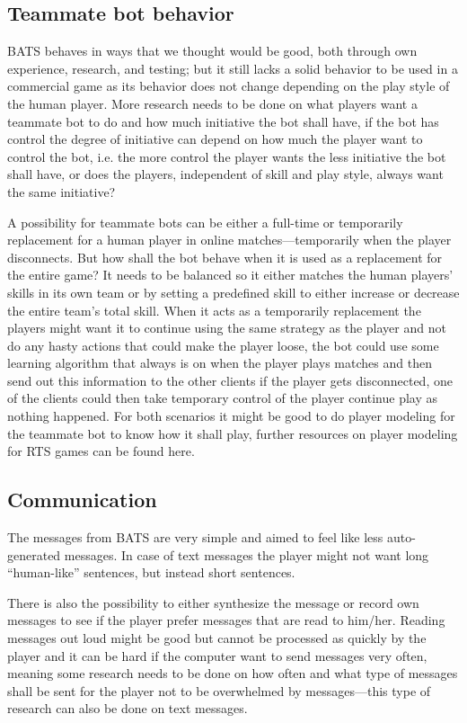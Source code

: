 \subsection{Teammate bot behavior}
BATS behaves in ways that we thought would be good, both through own experience, research, and
testing; but it still lacks a solid behavior to be used in a commercial game as its behavior does
not change depending on the play style of the human player. More research needs to be done on what
players want a teammate bot to do and how much initiative the bot shall have, if the bot has control
the degree of initiative can depend on how much the player want to control the bot, i.e. the more
control the player wants the less initiative the bot shall have, or does the players, independent of
skill and play style, always want the same initiative?

A possibility for teammate bots can be either a full-time or temporarily replacement for a human
player in online matches—temporarily when the player disconnects. But how shall the bot behave when
it is used as a replacement for the entire game? It needs to be balanced so it either matches the
human players' skills in its own team or by setting a predefined skill to either increase or
decrease the entire team's total skill.  When it acts as a temporarily replacement the players might
want it to continue using the same strategy as the player and not do any hasty actions that could
make the player loose, the bot could use some learning algorithm that always is on when the player
plays matches and then send out this information to the other clients if the player gets
disconnected, one of the clients could then take temporary control of the player continue play as
nothing happened.  For both scenarios it might be good to do player modeling for the teammate bot to
know how it shall play, further resources on player modeling for RTS games can be found
here\cite{bakkes09, jansen07, kabanza10, schadd07, synnaeve11}.

\subsection{Communication}
The messages from BATS are very simple and aimed to feel like less auto-generated messages. In case
of text messages the player might not want long ``human-like'' sentences, but instead short
sentences.

There is also the possibility to either synthesize the message or record own messages to see if the
player prefer messages that are read to him/her.  Reading messages out loud might be good but cannot
be processed as quickly by the player and it can be hard if the computer want to send messages very
often, meaning some research needs to be done on how often and what type of messages shall be sent
for the player not to be overwhelmed by messages—this type of research can also be done on text
messages.

